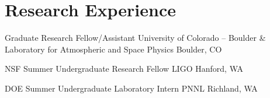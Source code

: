 \section{Research Experience}


		{Graduate Research Fellow/Assistant}
		{University of Colorado -- Boulder \& Laboratory for Atmospheric and Space Physics}
		{Boulder, CO}
		{}
		{}

		{NSF Summer Undergraduate Research Fellow}
		{LIGO}
		{Hanford, WA}
		{}
		{}

		{DOE Summer Undergraduate Laboratory Intern}
		{PNNL}
		{Richland, WA}
		{}
		{}
